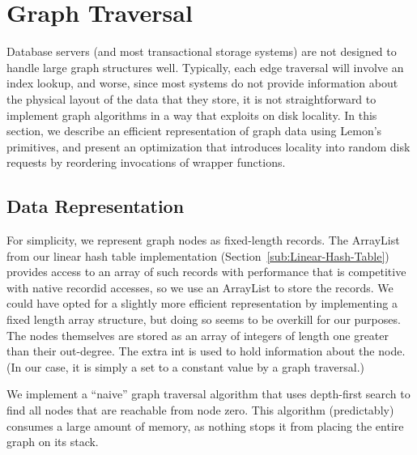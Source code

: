 \documentclass[10pt,letterpaper,twocolumn,english]{article}
\newcommand{\yad}{Lemon\xspace}
\begin{document}
%

\section{Graph Traversal\label{TransClos}}

Database servers (and most transactional storage systems) are not
designed to handle large graph structures well.  Typically, each edge
traversal will involve an index lookup, and worse, since most systems
do not provide information about the physical layout of the data that
they store, it is not straightforward to implement graph algorithms in
a way that exploits on disk locality.  In this section, we describe an
efficient representation of graph data using \yad's primitives, and
present an optimization that introduces locality into random disk
requests by reordering invocations of wrapper functions.

\subsection {Data Representation}

For simplicity, we represent graph nodes as
fixed-length records.  The ArrayList from our linear hash table
implementation (Section~\ref{sub:Linear-Hash-Table}) provides access to an
array of such records with performance that is competitive with native
recordid accesses, so we use an ArrayList to store the records.  We
could have opted for a slightly more efficient representation by
implementing a fixed length array structure, but doing so seems to be
overkill for our purposes.  The nodes themselves are stored as an
array of integers of length one greater than their out-degree. The
extra int is used to hold information about the node.  (In our case,
it is simply a set to a constant value by a graph traversal.)

We implement a ``naive'' graph traversal algorithm that uses depth-first search to find all nodes that are reachable from node zero.
This algorithm (predictably) consumes a large amount of memory, as
nothing stops it from placing the entire graph on its stack.  
\end{document}
